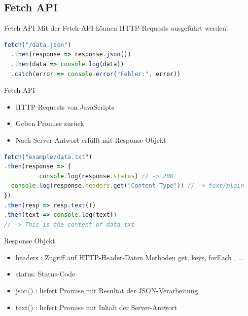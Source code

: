 \subsection{Fetch API}

\begin{definition}{Fetch API}
Mit der Fetch-API können HTTP-Requests ausgeführt werden:
\begin{lstlisting}[language=JavaScript, style=basesmol]
fetch("/data.json")
  .then(response => response.json())
  .then(data => console.log(data))
  .catch(error => console.error("Fehler:", error))
\end{lstlisting}
\end{definition}

\begin{definition}{Fetch API}
\begin{itemize}
\item HTTP-Requests von JavaScripts
\item Geben Promise zurück
\item Nach Server-Antwort erfüllt mit Response-Objekt
\end{itemize}
\end{definition}
\begin{lstlisting}[language=JavaScript, style=basesmol]
fetch("example/data.txt")
.then(response => {
          console.log(response.status) // -> 200
  console.log(response.headers.get("Content-Type")) // -> text/plain
})
.then(resp => resp.text())
.then(text => console.log(text))
// -> This is the content of data.txt
\end{lstlisting}

Response Objekt

\begin{itemize}
\item headers : Zugriff auf HTTP-Header-Daten Methoden get, keys, forEach , ...
\item status: Status-Code
\item json() : liefert Promise mit Resultat der JSON-Verarbeitung
\item text() : liefert Promise mit Inhalt der Server-Antwort
\end{itemize}